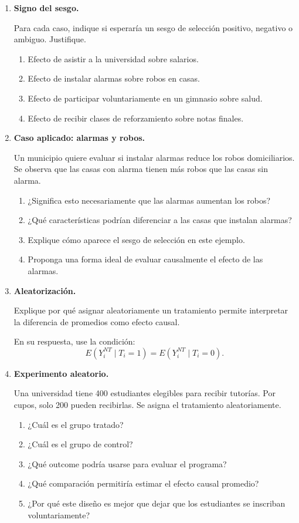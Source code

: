\documentclass[11pt]{article}
\begin{document}
\begin{enumerate}[label=\textbf{Ejercicio \arabic*.}, leftmargin=*]
\item \textbf{Signo del sesgo.}

Para cada caso, indique si esperaría un sesgo de selección positivo, negativo o ambiguo. Justifique.
\begin{enumerate}[label=\alph*)]
    \item Efecto de asistir a la universidad sobre salarios.
    \item Efecto de instalar alarmas sobre robos en casas.
    \item Efecto de participar voluntariamente en un gimnasio sobre salud.
    \item Efecto de recibir clases de reforzamiento sobre notas finales.
\end{enumerate}

\item \textbf{Caso aplicado: alarmas y robos.}

Un municipio quiere evaluar si instalar alarmas reduce los robos domiciliarios. Se observa que las casas con alarma tienen más robos que las casas sin alarma.

\begin{enumerate}[label=\alph*)]
    \item ¿Significa esto necesariamente que las alarmas aumentan los robos?
    \item ¿Qué características podrían diferenciar a las casas que instalan alarmas?
    \item Explique cómo aparece el sesgo de selección en este ejemplo.
    \item Proponga una forma ideal de evaluar causalmente el efecto de las alarmas.
\end{enumerate}

\item \textbf{Aleatorización.}

Explique por qué asignar aleatoriamente un tratamiento permite interpretar la diferencia de promedios como efecto causal.

En su respuesta, use la condición:
\[
E(Y_i^{NT}\mid T_i=1)=E(Y_i^{NT}\mid T_i=0).
\]

\item \textbf{Experimento aleatorio.}

Una universidad tiene 400 estudiantes elegibles para recibir tutorías. Por cupos, solo 200 pueden recibirlas. Se asigna el tratamiento aleatoriamente.

\begin{enumerate}[label=\alph*)]
    \item ¿Cuál es el grupo tratado?
    \item ¿Cuál es el grupo de control?
    \item ¿Qué outcome podría usarse para evaluar el programa?
    \item ¿Qué comparación permitiría estimar el efecto causal promedio?
    \item ¿Por qué este diseño es mejor que dejar que los estudiantes se inscriban voluntariamente?
\end{enumerate}


\end{enumerate}
\end{document}
